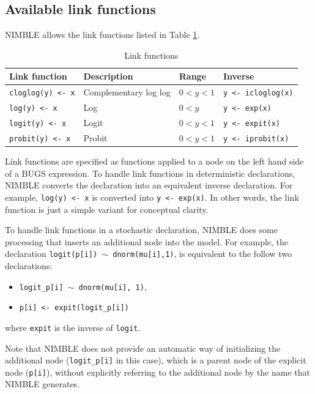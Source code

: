 \documentclass[12pt,oneside]{book}\usepackage[]{graphicx}\usepackage[]{color}
\def\cd#1{\texttt{#1}}
\begin{document}
\subsection{Available link functions}
\label{subsec:BUGS-link}

NIMBLE allows the link functions listed in Table \ref{table:links}.

\begin{center}
\begin{longtable}{llll}
\caption{Link functions \label{table:links}} \\
 \hline
Link function         & Description & Range & Inverse \\
\hline \hline
  \endhead
\verb+cloglog(y) <- x+ & Complementary log log & $0 < y < 1$ & \verb+y <- icloglog(x)+ \\
\verb+log(y) <- x+    & Log           & $0 < y$ &  \verb+y <- exp(x)+ \\
\verb+logit(y) <- x+  & Logit         & $0 < y < 1$ &  \verb+y <- expit(x)+ \\
\verb+probit(y) <- x+ & Probit        & $0 < y < 1$ &  \verb+y <- iprobit(x)+\\
\hline
\end{longtable}
\end{center}
      
Link functions are specified as functions applied to a node on the
left hand side of a BUGS expression. To handle link functions in
deterministic declarations, NIMBLE converts the declaration into an
equivalent inverse declaration.  For example, \cd{log(y) <- x} is
converted into \cd{y <- exp(x)}.  In other words, the link function is
just a simple variant for conceptual clarity.  

To handle link functions in a stochastic declaration, NIMBLE
does some processing that inserts an additional node into the model.
For example, the declaration \cd{logit(p[i]) $\sim$ dnorm(mu[i],1)}, is equivalent
to the follow two declarations: 
\begin{itemize}
\item \cd{logit\_p[i] $\sim$ dnorm(mu[i], 1)},
\item \cd{p[i] <- expit(logit\_p[i])}
\end{itemize}
where \cd{expit} is the inverse of \cd{logit}.  

Note that NIMBLE does not provide an automatic way of initializing the additional node (\cd{logit\_p[i]} in this case), which is a parent node of the explicit node (\cd{p[i]}), without explicitly referring to the additional node by the name that NIMBLE generates. 
\end{document}
